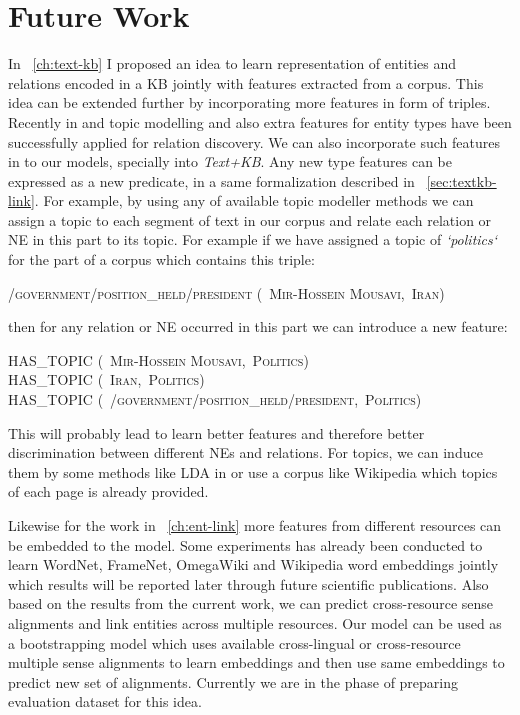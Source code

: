 \chapter{Future Work}
In ~\autoref{ch:text-kb} I proposed an idea to learn representation of entities
and relations encoded in a KB jointly with features extracted from a corpus.
This idea can be extended further by incorporating more features in form of
triples. Recently in \cite{Yao2012} and \cite{Riedel2010} topic
modelling and also extra features for entity types have been successfully
applied for relation discovery. We can also incorporate such features in to our
models, specially into \textit{Text+KB}. Any new type features can be expressed
as a new predicate, in a same formalization described in
~\autoref{sec:textkb-link}. For example, by using any of available topic
modeller methods we can assign a topic to each segment of text in our corpus and
relate each relation or NE in this part to its topic. For example if we have
assigned a topic of \textit{`politics`} for the part of a corpus which
contains this triple:
\begin{center}
 \textsc{ /government/position\_held/president (~Mir-Hossein Mousavi,~Iran)}
 \end{center}

then for any relation or NE occurred in this part we can introduce a
new feature:

\begin{center}
 \textsc{HAS\_TOPIC (~Mir-Hossein Mousavi,~Politics)}\\
 \textsc{HAS\_TOPIC (~Iran,~Politics)}\\
 \textsc{HAS\_TOPIC (~/government/position\_held/president,~Politics)}\\
 \end{center}

 This will probably lead to learn better features and therefore better
 discrimination between different NEs and relations. For topics, we can induce
 them by some methods like LDA in \cite{Blei2003} or use a corpus like Wikipedia
  which topics of each page is already provided.
  
  Likewise for the work in ~\autoref{ch:ent-link} more features from different
  resources can be embedded to the model. Some experiments has already been
  conducted to learn WordNet, FrameNet, OmegaWiki and Wikipedia word embeddings
  jointly which results will be reported later through future scientific
  publications. Also based on the results from the current work, we can predict
  cross-resource sense alignments and link entities across multiple resources.
  Our model can be used as a bootstrapping model which uses available
  cross-lingual or cross-resource multiple sense alignments to learn embeddings
  and then use same embeddings to predict new set of alignments. Currently we
  are in the phase of preparing evaluation dataset for this idea.
  
